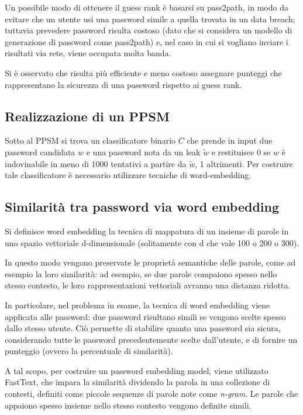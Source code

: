 Un possibile modo di ottenere il guess rank è basarsi su pass2path, in modo da evitare che un utente usi una password simile a quella trovata in un data breach; tuttavia prevedere password risulta costoso (dato che si considera un modello di generazione di password come pass2path) e, nel caso in cui si vogliano inviare i risultati via rete, viene occupata molta banda.

Si è osservato che risulta più efficiente e meno costoso assegnare punteggi che rappresentano la sicurezza di una password rispetto ai guess rank.

\subsection{Realizzazione di un PPSM}
Sotto al PPSM si trova un classificatore binario $C$ che prende in input due password candidata $w$ e una password nota da un leak $\tilde{w}$ e restituisce 0 se $w$ è indovinabile in meno di 1000 tentativi a partire da $\tilde{w}$, 1 altrimenti.
Per costruire tale classificatore è necessario utilizzare tecniche di word-embedding.

\subsection{Similarità tra password via word embedding}

Si definisce word embedding la tecnica di mappatura di un insieme di parole in uno spazio vettoriale d-dimensionale (solitamente con d che vale 100 o 200 o 300).

In questo modo vengono preservate le proprietà semantiche delle parole, come ad esempio la loro similarità: ad esempio, se due parole compaiono spesso nello stesso contesto, le loro rappresentazioni vettoriali avranno una distanza ridotta.

In particolare, nel problema in esame, la tecnica di word embedding viene applicata alle password: due password risultano simili se vengono scelte spesso dallo stesso utente. Ciò permette di stabilire quanto una password sia sicura, considerando tutte le password precedentemente scelte dall'utente, e di fornire un punteggio (ovvero la percentuale di similarità).

A tal scopo, per costruire un password embedding model, viene utilizzato FastText, che impara la similarità dividendo la parola in una collezione di contesti, definiti come piccole sequenze di parole note come \emph{n-gram}. Le parole che appaiono spesso insieme nello stesso contesto vengono definite simili.


